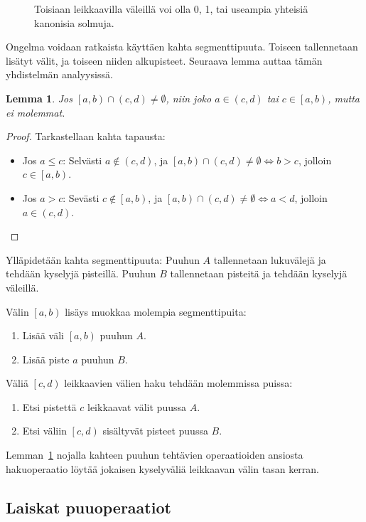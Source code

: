 \documentclass[finnish]{tktltiki2}
\newtheorem{lem}[lau]{Lemma}
\theoremstyle{definition}
\theoremstyle{remark}
\newcommand\range[2]{\ensuremath{\left [ #1 , #2 \right )}\xspace}
\newcommand\orange[2]{\ensuremath{\left ( #1 , #2 \right )}\xspace}
\begin{document}
\begin{figure}
\caption{Toisiaan leikkaavilla väleillä voi olla 0, 1, tai useampia yhteisiä kanonisia solmuja.}\label{kanonfailkuva}
\end{figure}

Ongelma voidaan ratkaista käyttäen kahta segmenttipuuta.
Toiseen tallennetaan lisätyt välit, ja toiseen niiden alkupisteet.
Seuraava lemma auttaa tämän yhdistelmän analyysissä.

\begin{lem}\label{segleikkaus2}Jos $\range{a}{b}\cap\orange{c}{d}\neq\emptyset$, niin joko $a\in\orange{c}{d}$ tai $c\in\range{a}{b}$, mutta ei molemmat.\end{lem}
\begin{proof}
Tarkastellaan kahta tapausta:
\begin{itemize}
\item Jos $a\le c$: Selvästi $a\notin\orange{c}{d}$, ja $\range{a}{b}\cap\orange{c}{d}\neq\emptyset \Leftrightarrow b>c$, jolloin $c\in\range{a}{b}$.
\item Jos $a>c$: Sevästi $c\notin\range{a}{b}$, ja $\range{a}{b}\cap\orange{c}{d}\neq\emptyset \Leftrightarrow a<d$, jolloin $a\in\orange{c}{d}$.
\end{itemize}
\end{proof}

Ylläpidetään kahta segmenttipuuta:
Puuhun $A$ tallennetaan lukuvälejä ja tehdään kyselyjä pisteillä.
Puuhun $B$ tallennetaan pisteitä ja tehdään kyselyjä väleillä.

Välin $\range{a}{b}$ lisäys muokkaa molempia segmenttipuita:
\begin{enumerate}
\item Lisää väli $\range{a}{b}$ puuhun $A$.
\item Lisää piste $a$ puuhun $B$.
\end{enumerate}

Väliä $\range{c}{d}$ leikkaavien välien haku tehdään molemmissa puissa:
\begin{enumerate}
\item Etsi pistettä $c$ leikkaavat välit puussa $A$.
\item Etsi väliin $\range{c}{d}$ sisältyvät pisteet puussa $B$.
\end{enumerate}

Lemman~\ref{segleikkaus2} nojalla kahteen puuhun tehtävien operaatioiden ansiosta hakuoperaatio löytää jokaisen kyselyväliä leikkaavan välin tasan kerran.

\subsection{Laiskat puuoperaatiot}
\end{document}
